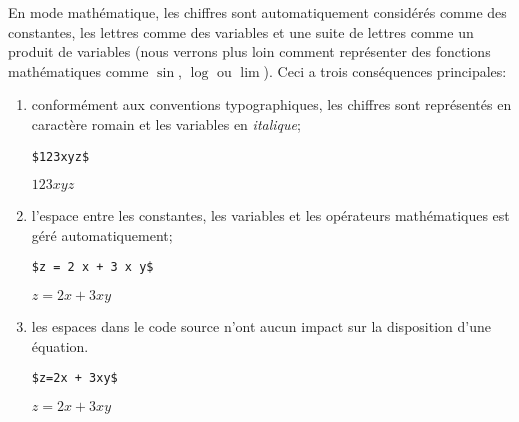 En mode mathématique, les chiffres sont automatiquement considérés
comme des constantes, les lettres comme des variables et une suite de
lettres comme un produit de variables (nous verrons plus loin comment
représenter des fonctions mathématiques comme $\sin$, $\log$ ou
$\lim$). Ceci a trois conséquences principales:
\begin{enumerate}
\item conformément aux conventions typographiques, les chiffres sont
  représentés en caractère \textrm{romain} et les variables en
  \emph{italique};
  \begin{demo}
    \begin{texample}
\begin{lstlisting}
$123xyz$
\end{lstlisting}
      \producing
      $123xyz$
    \end{texample}
  \end{demo}
\item l'espace entre les constantes, les variables et les opérateurs
  mathématiques est géré automatiquement;
  \begin{demo}
    \begin{texample}
\begin{lstlisting}
$z = 2 x + 3 x y$
\end{lstlisting}
    \producing
    $z = 2 x + 3 x y$
    \end{texample}
  \end{demo}
\item les espaces dans le code source n'ont aucun impact sur la
  disposition d'une équation.
  \begin{demo}
    \begin{texample}
\begin{lstlisting}
$z=2x + 3xy$
\end{lstlisting}
    \producing
    $z=2x + 3xy$
    \end{texample}
  \end{demo}
\end{enumerate}



